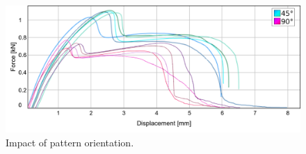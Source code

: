 \begin{figure}
	\centering
	\includegraphics[width=\columnwidth]{sources/testing/45vs90_stress_strain.png}
	\caption{Impact of pattern orientation.}
	\label{graph:45vs90_stress_strain}
\end{figure}
